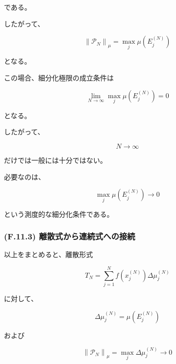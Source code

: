 \documentclass[a4paper,11pt]{article}
\begin{document}
である。

したがって、

\begin{equation}
    \left\|
    \mathcal{P}_N
    \right\|_\mu
    =
    \max_j
    \mu\!\left(E_j^{(N)}\right)
\end{equation}

となる。

この場合、細分化極限の成立条件は

\begin{equation}
    \boxed{
        \lim_{N\to\infty}
        \max_j
        \mu\!\left(E_j^{(N)}\right)
        =
        0
    }
    \label{eq:F-general-mesh-condition}
\end{equation}

となる。

したがって、

\begin{equation}
    N\to\infty
\end{equation}

だけでは一般には十分ではない。

必要なのは、

\begin{equation}
    \max_j
    \mu\!\left(E_j^{(N)}\right)
    \longrightarrow0
\end{equation}

という測度的な細分化条件である。


\subsubsection{(F.11.3) 離散式から連続式への接続}
\label{subsubsec:F11-3}

以上をまとめると、離散形式

\begin{equation}
    T_N
    =
    \sum_{j=1}^{N}
    f\!\left(x_j^{(N)}\right)
    \Delta\mu_j^{(N)}
\end{equation}

に対して、

\begin{equation}
    \Delta\mu_j^{(N)}
    =
    \mu\!\left(E_j^{(N)}\right)
\end{equation}

および

\begin{equation}
    \left\|
    \mathcal{P}_N
    \right\|_\mu
    =
    \max_j
    \Delta\mu_j^{(N)}
    \longrightarrow0
\end{equation}
\end{document}
